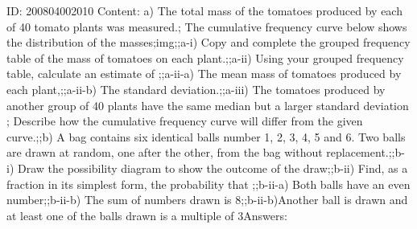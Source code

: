 \documentclass{article}
\begin{document}
ID: 200804002010
Content:
a) The total mass of the tomatoes produced by each of 40 tomato plants was measured.; The cumulative frequency curve below shows the distribution of the masses;img;;a-i) Copy and complete the grouped frequency table of the mass of tomatoes on each plant.;;a-ii) Using your grouped frequency table, calculate an estimate of ;;a-ii-a) The mean mass of tomatoes produced by each plant,;;a-ii-b) The standard deviation.;;a-iii) The tomatoes produced by another group of 40 plants have the same median but a larger standard deviation ; Describe how the cumulative frequency curve will differ from the given curve.;;b) A bag contains six identical balls number 1, 2, 3, 4, 5 and 6. Two balls are drawn at random, one after the other, from the bag without replacement.;;b-i) Draw the possibility diagram to show the outcome of the draw;;b-ii) Find, as a fraction in its simplest form, the probability that ;;b-ii-a) Both balls have an even number;;b-ii-b) The sum of numbers drawn is 8;;b-ii-b)Another ball is drawn and at least one of the balls drawn is a multiple of 3Answers:
\end{document}
